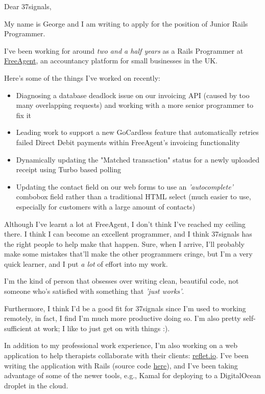 \documentclass[a4paper, 10pt]{letter}
\begin{document}
\begin{letter}{}

\opening{Dear 37signals,}


My name is George and I am writing to apply for the position of Junior Rails Programmer.

I've been working for around \emph{two and a half years} as a Rails Programmer at
\href{https://www.freeagent.com}{FreeAgent}, an accountancy platform for small businesses in the UK.

Here's some of the things I've worked on recently:
\begin{itemize}
\item Diagnosing a database deadlock issue on our invoicing API (caused by too many
overlapping requests) and working with a more senior programmer to fix it
\item Leading work to support a new GoCardless feature that automatically retries failed Direct Debit
payments within FreeAgent's invoicing functionality
\item Dynamically updating the "Matched transaction" status for a newly
uploaded receipt using Turbo based polling
\item Updating the contact field on our web forms to use an
\emph{'autocomplete'} combobox
field rather than a traditional HTML select (much easier to use, especially for customers
with a large amount of contacts)

\end{itemize}

Although I've learnt a lot at FreeAgent, I don't think I've reached my ceiling
there. I think I can become an excellent programmer, and I think 37signals has
the right people to help make that happen. Sure, when I arrive, I'll
probably make some mistakes that'll make the other programmers cringe, but I'm
a very quick learner, and I put \emph{a lot} of effort into my work.

I'm the kind of person that obsesses over writing clean, beautiful code, not
someone who's satisfied with something that \emph{'just works'}.

Furthermore, I think I'd be a good fit for 37signals since I'm used to working
remotely, in fact, I find I'm much more productive doing so. 
I'm also pretty self-sufficient at work; I like to just get on with things :).

In addition to my professional work experience, I'm also working on a web
application to help therapists collaborate with their clients:
\href{https://reflet.io}{reflet.io}. I've been
writing the application with Rails (source code
\href{https://github.com/gsbaker/reflet}{here}), and I've been taking
advantage of some of the newer tools, e.g., Kamal for deploying to
a DigitalOcean droplet in the cloud. 


\end{letter}
\end{document}
